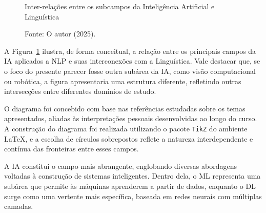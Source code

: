 \begin{figure}[h!]
\centering
\caption{Inter-relações entre os subcampos da Inteligência Artificial e Linguística}
\caption*{Fonte: O autor (2025).}
\label{fig:vennIA}
\end{figure}

A Figura~\ref{fig:vennIA} ilustra, de forma conceitual, a relação entre os principais campos da IA aplicados a NLP e suas interconexões com a Linguística. Vale destacar que, se o foco do presente parecer fosse outra subárea da IA, como visão computacional ou robótica, a figura apresentaria uma estrutura diferente, refletindo outras intersecções entre diferentes domínios de estudo.

O diagrama foi concebido com base nas referências estudadas sobre os temas apresentados, aliadas às interpretações pessoais desenvolvidas ao longo do curso. A construção do diagrama foi realizada utilizando o pacote \texttt{TikZ} do ambiente \LaTeX{}, e a escolha de círculos sobrepostos reflete a natureza interdependente e contínua das fronteiras entre esses campos.

A IA constitui o campo mais abrangente, englobando diversas abordagens voltadas à construção de sistemas inteligentes. Dentro dela, o ML representa uma subárea que permite às máquinas aprenderem a partir de dados, enquanto o DL surge como uma vertente mais específica, baseada em redes neurais com múltiplas camadas. 

